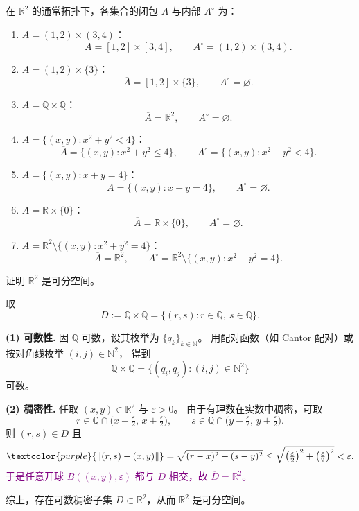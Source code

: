 \begin{solution}
在 $\mathbb{R}^2$ 的通常拓扑下，各集合的闭包 $\overline{A}$ 与内部 $A^\circ$ 为：

\begin{enumerate}[(1)]
  \item $A=(1,2)\times(3,4)$：
  \[
  \overline{A}=[1,2]\times[3,4],\qquad A^\circ=(1,2)\times(3,4).
  \]

  \item $A=(1,2)\times\{3\}$：
  \[
  \overline{A}=[1,2]\times\{3\},\qquad A^\circ=\varnothing.
  \]

  \item $A=\mathbb{Q}\times\mathbb{Q}$：
  \[
  \overline{A}=\mathbb{R}^2,\qquad A^\circ=\varnothing.
  \]

  \item $A=\{(x,y):x^2+y^2<4\}$：
  \[
  \overline{A}=\{(x,y):x^2+y^2\le 4\},\qquad A^\circ=\{(x,y):x^2+y^2<4\}.
  \]

  \item $A=\{(x,y):x+y=4\}$：
  \[
  \overline{A}=\{(x,y):x+y=4\},\qquad A^\circ=\varnothing.
  \]

  \item $A=\mathbb{R}\times\{0\}$：
  \[
  \overline{A}=\mathbb{R}\times\{0\},\qquad A^\circ=\varnothing.
  \]

  \item $A=\mathbb{R}^2\setminus\{(x,y):x^2+y^2=4\}$：
  \[
  \overline{A}=\mathbb{R}^2,\qquad A^\circ=\mathbb{R}^2\setminus\{(x,y):x^2+y^2=4\}.
  \]
\end{enumerate}
\end{solution}
\begin{homework}[第 8 题]
证明 $\mathbb{R}^2$ 是可分空间。
\begin{solution}
取
\[
D:=\mathbb{Q}\times\mathbb{Q}
=\{(r,s): r\in\mathbb{Q},\ s\in\mathbb{Q}\}.
\]

\textbf{(1) 可数性.}
因 $\mathbb{Q}$ 可数，设其枚举为 $\{q_k\}_{k\in\mathbb{N}}$。
用配对函数（如 Cantor 配对）或按对角线枚举 $(i,j)\in\mathbb{N}^2$，
得到
\[
\mathbb{Q}\times\mathbb{Q}
=\{(q_i,q_j):(i,j)\in\mathbb{N}^2\}
\]
可数。

\textbf{(2) 稠密性.}
任取 $(x,y)\in\mathbb{R}^2$ 与 $\varepsilon>0$。
由于有理数在实数中稠密，可取
\[
r\in\mathbb{Q}\cap\bigl(x-\tfrac{\varepsilon}{2},\,x+\tfrac{\varepsilon}{2}\bigr),\qquad
s\in\mathbb{Q}\cap\bigl(y-\tfrac{\varepsilon}{2},\,y+\tfrac{\varepsilon}{2}\bigr).
\]
则 $(r,s)\in D$ 且
\[
\textcolor{purple}{\|(r,s)-(x,y)\|}
=\sqrt{(r-x)^2+(s-y)^2}
\le \sqrt{\bigl(\tfrac{\varepsilon}{2}\bigr)^2+\bigl(\tfrac{\varepsilon}{2}\bigr)^2}
<\varepsilon.
\]
\textcolor{purple}{于是任意开球 $B((x,y),\varepsilon)$ 都与 $D$ 相交，故 $\overline{D}=\mathbb{R}^2$。}

综上，存在可数稠密子集 $D\subset\mathbb{R}^2$，从而 $\mathbb{R}^2$ 是可分空间。
\end{solution}

\end{homework}
